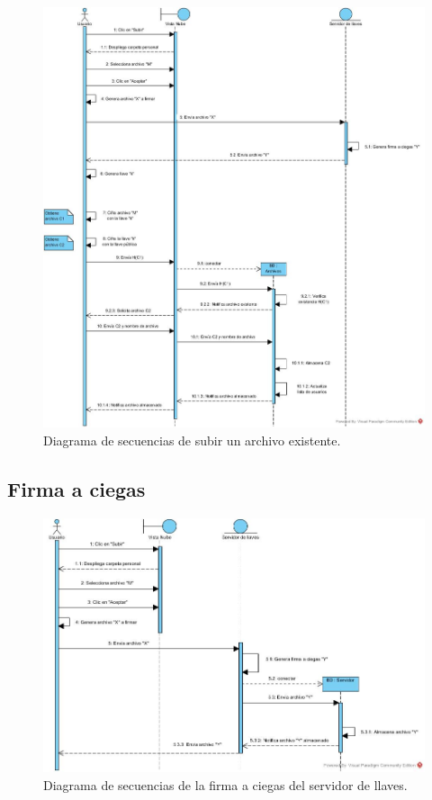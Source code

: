 \begin{figure}[htbp!]
		\centering
			\includegraphics[width=1\textwidth]{images/Subir_trayectoria_c}
		\caption{Diagrama de secuencias de subir un archivo existente.}
\end{figure} 
\newpage

\subsection{Firma a ciegas}

\begin{figure}[htbp!]
		\centering
			\includegraphics[width=1\textwidth]{images/Firma_ciegas}
		\caption{Diagrama de secuencias de la firma a ciegas del servidor de llaves.}
\end{figure} 
\newpage

